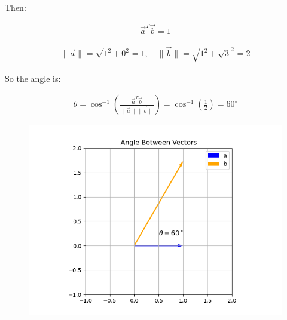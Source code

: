 \documentclass{article}
\begin{document}
Then:


\begin{align}
\vec{a}^T \vec{b} = 1
\end{align}




\begin{align}
\|\vec{a}\| = \sqrt{1^2 + 0^2} = 1, \quad
\|\vec{b}\| = \sqrt{1^2 + {\sqrt{3}}^2} = 2
\end{align}



So the angle is:


\begin{align}
\theta = \cos^{-1}\left(\frac{\vec{a}^T \vec{b}}{\|\vec{a}\| \|\vec{b}\|}\right)
= \cos^{-1}\left(\frac{1}{2}\right) = 60^\circ
\end{align}

\begin{figure}[H]
    \centering
    \includegraphics[width=0.7\linewidth]{figs/Figure_1.png}
    \caption{}
    \label{fig:fig1}
\end{figure}
\end{document}
